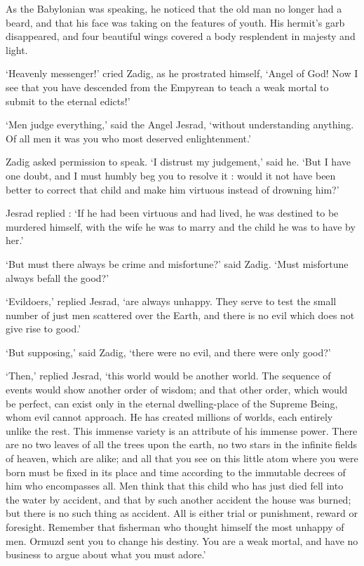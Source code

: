 \documentclass{article}
\begin{document}
\begin{center}
As the Babylonian was speaking, he noticed that the old man no longer had a beard, 
and that his face was taking on the features of youth. His hermit's garb disappeared, 
and four beautiful wings covered a body resplendent in majesty and light. 

`Heavenly messenger!' cried Zadig, as he prostrated himself, `Angel of God! Now 
I see that you have descended from the Empyrean to teach a weak mortal to submit 
to the eternal edicts!' 

`Men judge everything,' said the Angel Jesrad, `without understanding anything. 
Of all men it was you who most deserved enlightenment.' 

Zadig asked permission to speak. `I distrust my judgement,' said he. `But I have 
one doubt, and I must humbly beg you to resolve it : would it not have been better 
to correct that child and make him virtuous instead of drowning him?' 

Jesrad replied : `If he had been virtuous and had lived, he was destined to be 
murdered himself, with the wife he was to marry and the child he was to have by 
her.' 

`But must there always be crime and misfortune?' said Zadig. `Must misfortune always 
befall the good?' 

`Evildoers,' replied Jesrad, `are always unhappy. They serve to test the small 
number of just men scattered over the Earth, and there is no evil which does not 
give rise to good.' 

`But supposing,' said Zadig, `there were no evil, and there were only good?' 

`Then,' replied Jesrad, `this world would be another world. The sequence of events 
would show another order of wisdom; and that other order, which would be perfect, 
can exist only in the eternal dwelling-place of the Supreme Being, whom evil cannot 
approach. He has created millions of worlds, each entirely unlike the rest. This 
immense variety is an attribute of his immense power. There are no two leaves of 
all the trees upon the earth, no two stars in the infinite fields of heaven, which 
are alike; and all that you see on this little atom where you were born must be 
fixed in its place and time according to the immutable decrees of him who encompasses 
all. Men think that this child who has just died fell into the water by accident, 
and that by such another accident the house was burned; but there is no such thing 
as accident. All is either trial or punishment, reward or foresight. Remember that 
fisherman who thought himself the most unhappy of men. Ormuzd sent you to change 
his destiny. You are a weak mortal, and have no business to argue about what you 
must adore.' 


\end{center}
\end{document}
